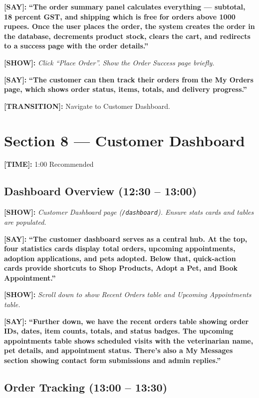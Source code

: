 \documentclass[12pt,a4paper]{article}
\newcommand{\say}[1]{\textbf{\textcolor{narration}{[SAY]:}} \textbf{``#1''}}
\newcommand{\show}[1]{\textbf{\textcolor{screen}{[SHOW]:}} \textit{#1}}
\newcommand{\timing}[1]{\textbf{\textcolor{timing}{[TIME]:}} #1}
\newcommand{\trans}[1]{\textbf{\textcolor{transition}{[TRANSITION]:}} #1}
\begin{document}
\say{The order summary panel calculates everything --- subtotal, 18 percent GST, and shipping which is free for orders above 1000 rupees. Once the user places the order, the system creates the order in the database, decrements product stock, clears the cart, and redirects to a success page with the order details.}

\show{Click ``Place Order''. Show the Order Success page briefly.}

\say{The customer can then track their orders from the My Orders page, which shows order status, items, totals, and delivery progress.}

\trans{Navigate to Customer Dashboard.}

\newpage

\section{Section 8 --- Customer Dashboard}
\label{sec:customer-dash}

\timing{1:00} \hfill Recommended

\subsection{Dashboard Overview (12:30 -- 13:00)}

\show{Customer Dashboard page (\texttt{/dashboard}). Ensure stats cards and tables are populated.}

\say{The customer dashboard serves as a central hub. At the top, four statistics cards display total orders, upcoming appointments, adoption applications, and pets adopted. Below that, quick-action cards provide shortcuts to Shop Products, Adopt a Pet, and Book Appointment.}

\show{Scroll down to show Recent Orders table and Upcoming Appointments table.}

\say{Further down, we have the recent orders table showing order IDs, dates, item counts, totals, and status badges. The upcoming appointments table shows scheduled visits with the veterinarian name, pet details, and appointment status. There's also a My Messages section showing contact form submissions and admin replies.}

\subsection{Order Tracking (13:00 -- 13:30)}
\end{document}
